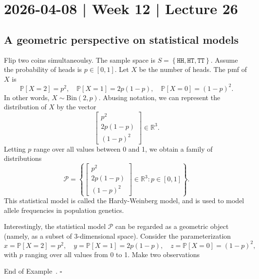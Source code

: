 \documentclass[10pt]{article}
\theoremstyle{definition}
\newtheorem{example}[theorem]{Example}
\renewenvironment{example}
{\begin{oldexample}}
  {\par\smallskip\hfill   End of Example~\theexample. $\square$    \par\end{oldexample}}
\newcommand{\1}[1]{\textbf{1}_{\left[#1\right]}} %
\def\R{\mathbb{R}} %
\def\P{\mathbb{P}} %
\begin{document}
\newpage
\section{2026-04-08 | Week 12 | Lecture 26}
\subsection{A geometric perspective on statistical models}
\begin{example}[The Hardy-Weinberg Model]
  \label{ex:hardy-weinberg-model}
  Flip two coins simultaneoulsy. The sample space is
  $S = \left\{\mathtt{HH},\mathtt{HT}, \mathtt{TT}\right\}$. Assume the
  probability of heads is $p\in [0,1]$. Let $X$ be the number of heads. The
  pmf of $X$ is
  \begin{equation*}
    \P\left[X=2 \right] 
    = p^{2}, \quad \P\left[X=1 \right] 
    = 2p(1-p), \quad \P\left[X=0 \right] 
    = (1-p)^{2}.
  \end{equation*}
  In other words, $X\sim \text{Bin}(2,p)$. Abusing notation, we can represent
  the distribution of $X$ by the vector
  \begin{equation*}
    \begin{bmatrix}
      p^{2}\\
      2p(1-p)\\
      (1-p)^{2}
    \end{bmatrix}\in \R^{3}.
  \end{equation*}
  Letting $p$ range over all values between 0 and 1, we obtain a family of
  distributions
  \begin{equation*}
    \mathcal{P} = \left\{
      \begin{bmatrix}
        p^{2}\\
        2p(1-p)\\
        (1-p)^{2}
      \end{bmatrix}\in \R^{3}: p\in [0,1]\right\}.
  \end{equation*}
  This statistical model is called the Hardy-Weinberg model, and is used to
  model allele frequencies in population genetics.

  Interestingly, the
  statistical model $\mathcal{P}$ can be regarded as a geometric object
  (namely, as a subset of 3-dimensional space). Consider the parameterization
  \begin{equation*}
    x = \P\left[X=2 \right] = p^{2},
    \quad
    y = \P\left[X=1 \right] = 2p(1-p),
    \quad
    z = \P\left[X=0 \right] = (1-p)^{2},
  \end{equation*}
  with $p$ ranging  over all values from 0 to 1. Make two observations


\end{example}
\end{document}
